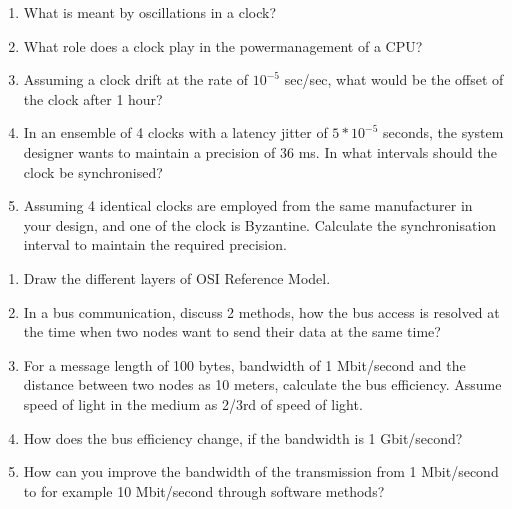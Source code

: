 \begin{enumerate}
\item What is meant by oscillations in a clock?
\item What role does a clock play in the powermanagement of a CPU?
\item Assuming a clock drift at the rate of $10^{-5}$ sec/sec, what would be the offset of the clock after 1 hour?
\item In an ensemble of 4 clocks with a latency jitter of $5*10^{-5}$ seconds, the system designer wants to maintain a precision of 36 ms. In what intervals should the clock be synchronised?
\item Assuming 4 identical clocks are employed from the same manufacturer in your design, and one of the clock is Byzantine. Calculate the synchronisation interval to maintain the required precision.
\end{enumerate}

\begin{tcolorbox}[height fill, title=Your solution]
\end{tcolorbox}


\pagebreak

\begin{enumerate}

\item Draw the different layers of OSI Reference Model.
\item In a bus communication, discuss 2 methods, how the bus access is resolved at the time when two nodes want to send their data at the same time?
\item For a message length of 100 bytes, bandwidth of 1 Mbit/second and the distance between two nodes as 10 meters, calculate the bus efficiency. Assume speed of light in the medium as 2/3rd of speed of light.
\item How does the bus efficiency change, if the bandwidth is 1 Gbit/second?
\item How can you improve the bandwidth of the transmission from 1 Mbit/second to for example 10 Mbit/second through software methods? 
\end{enumerate}

